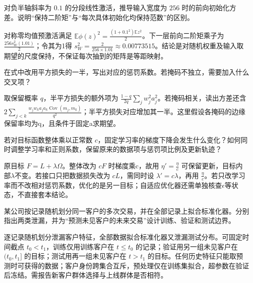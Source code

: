 \begin{exercises}
\begin{exercise}\optional 对负半轴斜率为 $0.1$ 的分段线性激活，推导输入宽度为 $256$ 时的前向初始化方差。说明“保持二阶矩”与“每次具体初始化均保持范数”的区别。

\begin{solution}
对称零均值预激活满足 $\mathbb E\phi(z)^2=\frac{(1+0.1^2)\mathbb Ez^2}{2}$。下一层前向二阶矩乘子为 $\frac{256s_W^2(1.01)}{2}$；令其为1得 $s_W^2=\frac{2}{256\times1.01}\approx0.00773515$。结论是对随机权重及输入取期望的尺度保持，不保证每次抽到的矩阵是等距映射。
\end{solution}
\end{exercise}

\begin{exercise} 在式中改用平方损失的一半，写出对应的惩罚系数。若掩码不独立，需要加入什么交叉项？

\begin{solution}
取保留概率 $q$，半平方损失的额外项为 $\frac{1-q}{2q}\sum_jw_j^2a_j^2$。若掩码相关，读出方差还含 $2\sum_{j<k}\frac{w_jw_ka_ja_k\operatorname{Cov}(m_j,m_k)}{q^2}$；半平方损失对应增加其一半。这里假设各掩码的边缘保留率均为q，且条件于固定a求期望。
\end{solution}
\end{exercise}

\begin{exercise} 若对目标函数整体乘以正常数 $c$，固定学习率的梯度下降会发生什么变化？如何同时调整学习率和正则系数，保留原来的数据项与惩罚项比例及更新轨迹？

\begin{solution}
原目标 $F=L+\lambda\Omega$。整体改为 $cF$ 时梯度乘c，故用 $\eta'=\frac{\eta}{c}$ 可保留更新，目标内部$\lambda$不变。若接口只把数据损失改为 $cL$，需同时设 $\lambda'=c\lambda$，再用 $\frac{\eta}{c}$。若只改学习率而不改相对惩罚系数，优化的是另一目标；自适应优化器还需单独核查$\epsilon$等状态，不直接套本结论。
\end{solution}
\end{exercise}

\begin{exercise} 某公司按记录随机划分同一客户的多次交易，并在全部记录上拟合标准化器。分别指出两类泄漏，并为“预测未见客户的未来交易”设计训练、验证和测试边界。

\begin{solution}
逐记录随机划分泄漏客户特征，全部数据拟合标准化器又泄漏测试分布。可固定时间截点 $t_0<t_1$，训练仅用训练客户在 $t\le t_0$ 的记录；验证用另一组未见客户在 $(t_0,t_1]$ 的目标；测试用再一组未见客户在 $t>t_1$ 的目标。任何历史特征只能取预测时可获得的数据；客户身份跨集合互斥，预处理仅在训练集拟合，超参数在验证后冻结。需报告新客户群体选择与上线群体是否相符。
\end{solution}
\end{exercise}


\end{exercises}
